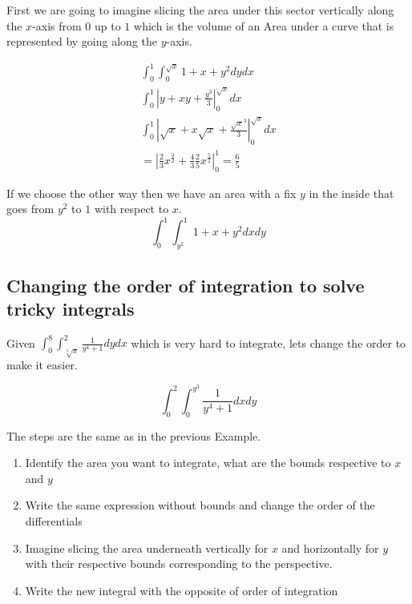 First we are going to imagine slicing the area under this sector vertically along the \(x\)-axis from \(0\) up to \(1\) which
is the volume of an Area under a curve that is represented by going along the \(y\)-axis.

\begin{align*}
    \int_{0}^{1}\int_{0}^{\sqrt{x}} 1 + x + y^2 dy dx \\
    \int_{0}^{1} \left| y + xy + \frac{y^3}{3} \right|_{0}^{\sqrt{x}} dx \\
    \int_{0}^{1} \left| \sqrt{x} + x\sqrt{x} + \frac{\sqrt{x}^3}{3} \right|_{0}^{\sqrt{x}} dx \\
    = \left| \frac{2}{3} x^{\frac{3}{2}} + \frac{4}{3} \frac{2}{5} x^{\frac{5}{2}} \right|_{0}^{1} = \frac{6}{5}
\end{align*}

If we choose the other way then we have an area with a fix \(y\) in the inside that goes from \(y^2\) to \(1\) with respect to \(x\).
\[
\int_{0}^{1}\int_{y^2}^{1} 1 + x + y^2 dx dy
\]

\subsection{Changing the order of integration to solve tricky integrals}

Given \(\int_{0}^{8}\int_{\sqrt[3]{x}}^{2} \frac{1}{y^4 +1}dy dx\) which is very hard to integrate, lets change the order
to make it easier.

\[\int_{0}^{2}\int_{0}^{y^3} \frac{1}{y^4 +1}dx dy\]

The steps are the same as in the previous Example.

\begin{enumerate}
    \item Identify the area you want to integrate, what are the bounds respective to \(x\) and \(y\)
    \item Write the same expression without bounds and change the order of the differentials
    \item Imagine slicing the area underneath vertically for \(x\) and horizontally for \(y\) with their respective bounds corresponding
    to the perspective.
    \item Write the new integral with the opposite of order of integration
\end{enumerate}

